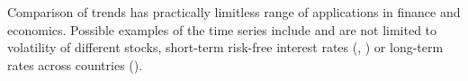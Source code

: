\documentclass[a4paper,12pt]{article}
\begin{document}
\begin{example}
Comparison of trends has practically limitless range of applications in finance and economics. Possible examples of the time series include and are not limited to volatility of different stocks, short-term risk-free interest rates (\cite{Fan2008}, \cite{Park2009}) or long-term rates across countries (\cite{Park2009}).

\end{example}
\end{document}

